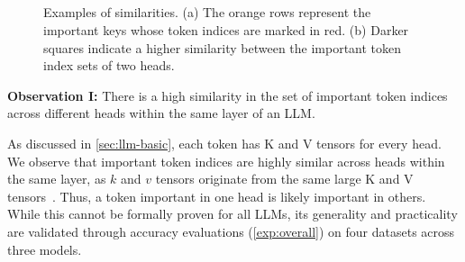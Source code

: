 \subsection{\techA{}}

\label{sec:techa}

\begin{figure}
	\centering
	\hspace{0.06in}
	\vspace{-0.1in}
	\caption{Examples of similarities. (a) The orange rows represent the important keys whose token indices are marked in red. (b) Darker squares indicate a higher similarity between the important token index sets of two heads.}
	\vspace{-0.1in}
\end{figure}




\noindent
\textbf{Observation I:}{
	There is a high similarity in the set of important token indices 
	across different heads within the same layer of an LLM.
}


As discussed in \cref{sec:llm-basic}, each token has K and V tensors for every head. 
We observe that important token indices are highly similar across heads within the same layer, 
as \(k\) and \(v\) tensors originate from the same large K and V tensors~\cite{alluneed-nips17, opt-arxiv22}. 
Thus, a token important in one head is likely important in others. 
While this cannot be formally proven for all LLMs, its generality and practicality are validated through accuracy evaluations (\cref{exp:overall}) on four datasets across three models.


